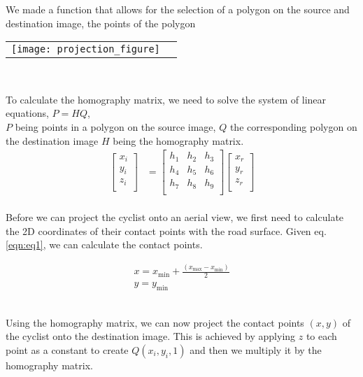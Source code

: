 We made a function that allows for the selection of a polygon on the source and destination image, the points
of the polygon

\noindent
\begin{tabular}{@{}cc}
\texttt{[image: projection\_figure]} 
\end{tabular}
\label{projection_figure}
\

To calculate the homography matrix, we need to solve the system of linear equations, $P = HQ$,
\ \\
$P$ being points in a polygon on the source image, $Q$ the corresponding polygon on the destination image $H$ being the homography matrix.
\begin{align}
\label{eq:3}
  \begin{bmatrix}
    x_{i} \\
    y_{i} \\
    z_{i} \\
  \end{bmatrix}
  &= \begin{bmatrix}
      h_1 & h_2 & h_3 \\
      h_4 & h_5 & h_6 \\
      h_7 & h_8 & h_9 \\
  \end{bmatrix}
  \begin{bmatrix}
    x_{r} \\
    y_{r} \\
    z_{r} \\
  \end{bmatrix}
\end{align}
\ \\

Before we can project the cyclist onto an aerial view, we first need to calculate the 2D coordinates of their contact points with the road surface.
Given eq. \ref{eqn:eq1}, we can calculate the contact points.

\begin{equation}
\label{eqn:eq1}
\begin{array}{l}
x = x_\mathrm{min} + \frac{(x_\mathrm{max} - x_\mathrm{min})}{2} \\
y = y_\mathrm{min}
\end{array}
\end{equation}
\

Using the homography matrix, we can now project the contact points $(x, y)$ of the cyclist onto the destination
image. This is achieved by applying $z$ to each point as a constant to create $Q(x_i, y_i, 1)$ and then we multiply it by the homography matrix. 

